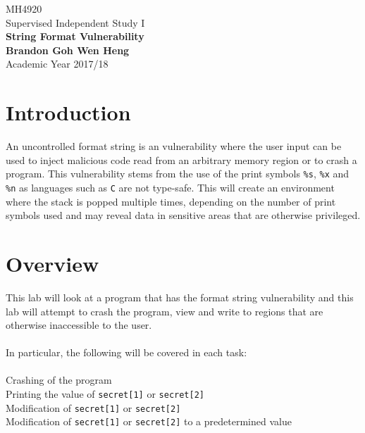 \documentclass[a4paper,12pt]{article}
\newcommand*\circled[1]{\tikz[baseline=(char.base)]{
		\node[shape=circle,draw,inner sep=2pt] (char) {#1};}}
\begin{document}
	\begin{titlepage}
		\begin{center}
			\vspace*{9em}
			\Huge 
			MH4920\\ Supervised Independent Study I\\
			\vspace*{4em}
			\LARGE
			\textbf{String Format Vulnerability}\\		
			\vspace{4em}
			\textbf{Brandon Goh Wen Heng}\\
			\vspace*{4em}
			Academic Year 2017/18
			\vfill
		\end{center}
	\end{titlepage}
	
	\tableofcontents
	\newpage
	\section{Introduction}
	An uncontrolled format string is an vulnerability where the user input can be used to inject malicious code read from an arbitrary memory region or to crash a program. This vulnerability stems from the use of the print symbols \texttt{\%s}, \texttt{\%x} and \texttt{\%n} as languages such as \texttt{C} are not type-safe. This will create an environment where the stack is popped multiple times, depending on the number of print symbols used and may reveal data in sensitive areas that are otherwise privileged.
	\section{Overview}
	This lab will look at a program that has the format string vulnerability and this lab will attempt to crash the program, view and write to regions that are otherwise inaccessible to the user.\\\\In particular, the following will be covered in each task:\\\\
	\circled{1} Crashing of the program\\\circled{2} Printing the value of \texttt{secret[1]} or \texttt{secret[2]}\\\circled{3} Modification of \texttt{secret[1]} or \texttt{secret[2]}\\\circled{4} Modification of \texttt{secret[1]} or \texttt{secret[2]} to a predetermined value
	\newpage
\end{document}
